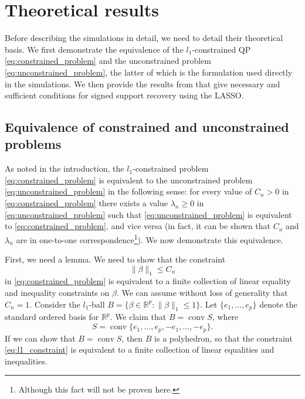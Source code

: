 \documentclass[letterpaper,12pt]{article}
\DeclareMathOperator{\conv}{conv}
\newcommand{\norm}[1]{\lVert#1\rVert}
\begin{document}
\section*{Theoretical results}

Before describing the simulations in detail, we need to detail their
theoretical basis. We first demonstrate the equivalence of the
$l_1$-constrained QP \eqref{eq:constrained_problem} and the
unconstrained problem \eqref{eq:unconstrained_problem}, the latter of
which is the formulation used directly in the simulations. We then
provide the results from \cite{wainwright06} that give necessary and
sufficient conditions for signed support recovery using the LASSO.

\subsection*{Equivalence of constrained and unconstrained problems}

As noted in the introduction, the $l_1$-constrained problem
\eqref{eq:constrained_problem} is equivalent to the unconstrained
problem \eqref{eq:unconstrained_problem} in the following sense: for
every value of $C_n > 0$ in \eqref{eq:constrained_problem} there
exists a value $\lambda_n \geq 0$ in \eqref{eq:unconstrained_problem}
such that \eqref{eq:unconstrained_problem} is equivalent to
\eqref{eq:constrained_problem}, and vice versa (in fact, it can be
shown that $C_n$ and $\lambda_n$ are in one-to-one
correspondence\footnote{Although this fact will not be proven
  here.}). We now demonstrate this equivalence.

First, we need a lemma. We need to show that the constraint
\begin{equation} \label{eq:l1_constraint}
  \norm{\beta}_1 \leq C_n
\end{equation}
in \eqref{eq:constrained_problem} is equivalent to a finite collection
of linear equality and inequality constraints on $\beta$. We can
assume without loss of generality that $C_n = 1$. Consider the
$l_1$-ball $B = \{\beta \in \mathbb{R}^p : \norm{\beta}_1 \leq
1\}$. Let $\{e_1, \ldots, e_p\}$ denote the standard ordered basis for
$\mathbb{R}^p$. We claim that $B = \conv S$, where
\begin{equation*}
  S = \conv\{e_1, \ldots, e_p, -e_1, \ldots, -e_p\}.
\end{equation*}
If we can show that $B = \conv S$, then $B$ is a polyhedron, so that
the constraint \eqref{eq:l1_constraint} is equivalent to a finite
collection of linear equalities and inequalities.
\end{document}
